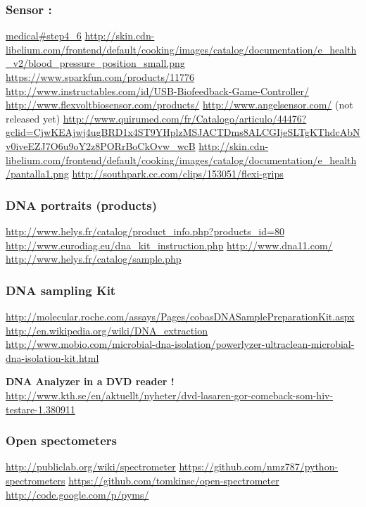\subsubsection {Sensor :}
\href{http://www.cooking-hacks.com/documentation/tutorials/ehealth-biometric-sensor-platform-arduino-raspberry-pi-medical#step4_6}{medical\#step4\_6}
\url{http://skin.cdn-libelium.com/frontend/default/cooking/images/catalog/documentation/e_health_v2/blood_pressure_position_small.png}
\url{https://www.sparkfun.com/products/11776}
\url{http://www.instructables.com/id/USB-Biofeedback-Game-Controller/}
\url{http://www.flexvoltbiosensor.com/products/}
\url{http://www.angelsensor.com/} (not released yet)
\url{http://www.quirumed.com/fr/Catalogo/articulo/44476?gclid=CjwKEAjwj4ugBRD1x4ST9YHplzMSJACTDms8ALCGIjeSLTgKThdcAbNv0iveEZJ7O6u9oY2z8PORrBoCkOvw_wcB}
\url{http://skin.cdn-libelium.com/frontend/default/cooking/images/catalog/documentation/e_health/pantalla1.png}
\url{http://southpark.cc.com/clips/153051/flexi-grips}
~
\subsubsection {DNA portraits (products)}
\url{http://www.helys.fr/catalog/product_info.php?products_id=80}
\url{http://www.eurodiag.eu/dna_kit_instruction.php}
\url{http://www.dna11.com/}
\url{http://www.helys.fr/catalog/sample.php}
~

\subsubsection {DNA sampling Kit}

\url{http://molecular.roche.com/assays/Pages/cobasDNASamplePreparationKit.aspx}
\url{http://en.wikipedia.org/wiki/DNA_extraction}
\url{http://www.mobio.com/microbial-dna-isolation/powerlyzer-ultraclean-microbial-dna-isolation-kit.html}

\bigskip

\textbf{DNA Analyzer in a DVD reader !}
\url{http://www.kth.se/en/aktuellt/nyheter/dvd-lasaren-gor-comeback-som-hiv-testare-1.380911}
~
\subsubsection {Open spectometers}
\url{http://publiclab.org/wiki/spectrometer}
\url{https://github.com/nmz787/python-spectrometers}
\url{https://github.com/tomkinsc/open-spectrometer}
\url{http://code.google.com/p/pyms/}
~
